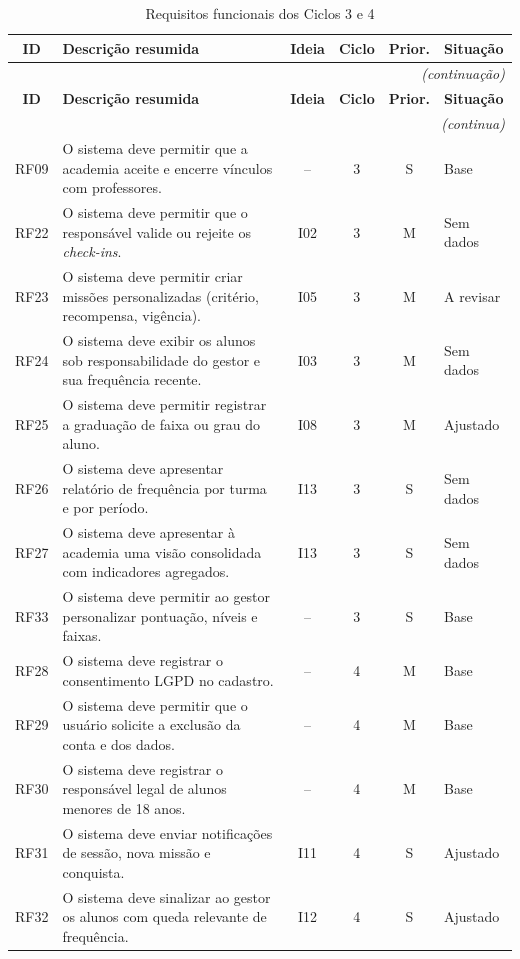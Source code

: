 \begin{quadrolongo}
\begin{longtable}{|c|p{7.3cm}|c|c|c|p{1.6cm}|}
  \caption{Requisitos funcionais dos Ciclos 3 e 4}\label{qua:rf2}\\
  \hline
  \textbf{ID} & \textbf{Descrição resumida} & \textbf{Ideia} & \textbf{Ciclo} & \textbf{Prior.} & \textbf{Situação} \\ \hline
\endfirsthead
  \multicolumn{6}{r}{\textit{(continuação)}}\\
  \hline
  \textbf{ID} & \textbf{Descrição resumida} & \textbf{Ideia} & \textbf{Ciclo} & \textbf{Prior.} & \textbf{Situação} \\ \hline
\endhead
  \multicolumn{6}{r}{\textit{(continua)}}\\
\endfoot
\endlastfoot
    RF09 & O sistema deve permitir que a academia aceite e encerre vínculos com professores. & -- & 3 & S & Base \\ \hline
    RF22 & O sistema deve permitir que o responsável valide ou rejeite os \textit{check-ins}. & I02 & 3 & M & Sem dados \\ \hline
    RF23 & O sistema deve permitir criar missões personalizadas (critério, recompensa, vigência). & I05 & 3 & M & A revisar \\ \hline
    RF24 & O sistema deve exibir os alunos sob responsabilidade do gestor e sua frequência recente. & I03 & 3 & M & Sem dados \\ \hline
    RF25 & O sistema deve permitir registrar a graduação de faixa ou grau do aluno. & I08 & 3 & M & Ajustado \\ \hline
    RF26 & O sistema deve apresentar relatório de frequência por turma e por período. & I13 & 3 & S & Sem dados \\ \hline
    RF27 & O sistema deve apresentar à academia uma visão consolidada com indicadores agregados. & I13 & 3 & S & Sem dados \\ \hline
    RF33 & O sistema deve permitir ao gestor personalizar pontuação, níveis e faixas. & -- & 3 & S & Base \\ \hline
    RF28 & O sistema deve registrar o consentimento LGPD no cadastro. & -- & 4 & M & Base \\ \hline
    RF29 & O sistema deve permitir que o usuário solicite a exclusão da conta e dos dados. & -- & 4 & M & Base \\ \hline
    RF30 & O sistema deve registrar o responsável legal de alunos menores de 18 anos. & -- & 4 & M & Base \\ \hline
    RF31 & O sistema deve enviar notificações de sessão, nova missão e conquista. & I11 & 4 & S & Ajustado \\ \hline
    RF32 & O sistema deve sinalizar ao gestor os alunos com queda relevante de frequência. & I12 & 4 & S & Ajustado \\ \hline
\end{longtable}
\end{quadrolongo}

